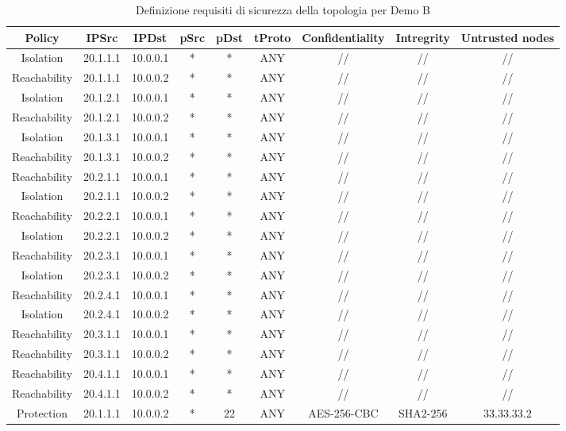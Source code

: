 \begin{table}[H]
    \centering
    \small
    \setlength{\tabcolsep}{2pt} %
   \begin{tabular}{ccccccccc}
        \hline
         Policy & IPSrc & IPDst & pSrc & pDst & tProto & Confidentiality & Intregrity & Untrusted nodes\\
        \hline
        Isolation & 20.1.1.1 & 10.0.0.1 & * & * & ANY & // & // & // \\
        Reachability & 20.1.1.1 & 10.0.0.2 & * & * & ANY & // & // & // \\
        \hline
        Isolation & 20.1.2.1 & 10.0.0.1 & * & * & ANY & // & // & // \\
        Reachability & 20.1.2.1 & 10.0.0.2 & * & * & ANY & // & // & // \\
        \hline
        Isolation & 20.1.3.1 & 10.0.0.1 & * & * & ANY & // & // & // \\
        Reachability & 20.1.3.1 & 10.0.0.2 & * & * & ANY & // & // & // \\
        \hline
        Reachability & 20.2.1.1 & 10.0.0.1 & * & * & ANY & // & // & // \\
        Isolation & 20.2.1.1 & 10.0.0.2 & * & * & ANY & // & // & // \\
        \hline
        Reachability & 20.2.2.1 & 10.0.0.1 & * & * & ANY & // & // & // \\
        Isolation & 20.2.2.1 & 10.0.0.2 & * & * & ANY & // & // & // \\
        \hline
        Reachability & 20.2.3.1 & 10.0.0.1 & * & * & ANY & // & // & // \\
        Isolation & 20.2.3.1 & 10.0.0.2 & * & * & ANY & // & // & // \\
        \hline
        Reachability & 20.2.4.1 & 10.0.0.1 & * & * & ANY & // & // & // \\
        Isolation & 20.2.4.1 & 10.0.0.2 & * & * & ANY & // & // & // \\
        \hline
        Reachability & 20.3.1.1 & 10.0.0.1 & * & * & ANY & // & // & // \\
        Reachability & 20.3.1.1 & 10.0.0.2 & * & * & ANY & // & // & // \\
        \hline
        Reachability & 20.4.1.1 & 10.0.0.1 & * & * & ANY & // & // & // \\
        Reachability & 20.4.1.1 & 10.0.0.2 & * & * & ANY & // & // & // \\
        \hline
        Protection & 20.1.1.1 & 10.0.0.2 & * & 22 & ANY & AES-256-CBC & SHA2-256 & 33.33.33.2 \\
        \hline
    \end{tabular}
    \caption{Definizione requisiti di sicurezza della topologia per Demo B}
    \label{tab:tabellaNodiB}
\end{table}

